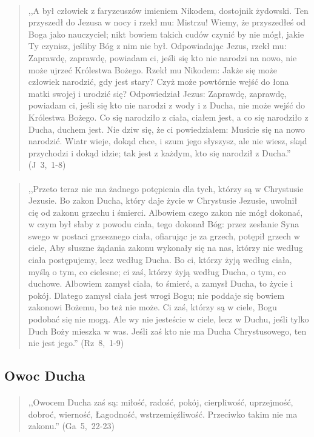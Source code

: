 \documentclass[10pt,a4paper,oneside]{article}
\begin{document}
\paragraph{}
\begin{quote}
,,A był człowiek z faryzeuszów imieniem Nikodem, dostojnik żydowski. Ten przyszedł do Jezusa w nocy i rzekł mu: Mistrzu! Wiemy, że przyszedłeś od Boga jako nauczyciel; nikt bowiem takich cudów czynić by nie mógł, jakie Ty czynisz, jeśliby Bóg z nim nie był. Odpowiadając Jezus, rzekł mu: Zaprawdę, zaprawdę, powiadam ci, jeśli się kto nie narodzi na nowo, nie może ujrzeć Królestwa Bożego. Rzekł mu Nikodem: Jakże się może człowiek narodzić, gdy jest stary? Czyż może powtórnie wejść do łona matki swojej i urodzić się? Odpowiedział Jezus: Zaprawdę, zaprawdę, powiadam ci, jeśli się kto nie narodzi z wody i z Ducha, nie może wejść do Królestwa Bożego. Co się narodziło z ciała, ciałem jest, a co się narodziło z Ducha, duchem jest. Nie dziw się, że ci powiedziałem: Musicie się na nowo narodzić. Wiatr wieje, dokąd chce, i szum jego słyszysz, ale nie wiesz, skąd przychodzi i dokąd idzie; tak jest z każdym, kto się narodził z Ducha.'' \mbox{(J 3, 1-8)}
\end{quote}
\paragraph{}
\begin{quote}
,,Przeto teraz nie ma żadnego potępienia dla tych, którzy są w Chrystusie Jezusie. Bo zakon Ducha, który daje życie w Chrystusie Jezusie, uwolnił cię od zakonu grzechu i śmierci. Albowiem czego zakon nie mógł dokonać, w czym był słaby z powodu ciała, tego dokonał Bóg: przez zesłanie Syna swego w postaci grzesznego ciała, ofiarując je za grzech, potępił grzech w ciele, Aby słuszne żądania zakonu wykonały się na nas, którzy nie według ciała postępujemy, lecz według Ducha. Bo ci, którzy żyją według ciała, myślą o tym, co cielesne; ci zaś, którzy żyją według Ducha, o tym, co duchowe. Albowiem zamysł ciała, to śmierć, a zamysł Ducha, to życie i pokój. Dlatego zamysł ciała jest wrogi Bogu; nie poddaje się bowiem zakonowi Bożemu, bo też nie może. Ci zaś, którzy są w ciele, Bogu podobać się nie mogą. Ale wy nie jesteście w ciele, lecz w Duchu, jeśli tylko Duch Boży mieszka w was. Jeśli zaś kto nie ma Ducha Chrystusowego, ten nie jest jego.'' \mbox{(Rz 8, 1-9)}
\end{quote}
\subsection{Owoc Ducha}
\paragraph{}
\begin{quote}
,,Owocem Ducha zaś są: miłość, radość, pokój, cierpliwość, uprzejmość, dobroć, wierność, Łagodność, wstrzemięźliwość. Przeciwko takim nie ma zakonu.'' \mbox{(Ga 5, 22-23)}
\end{quote}
\end{document}
